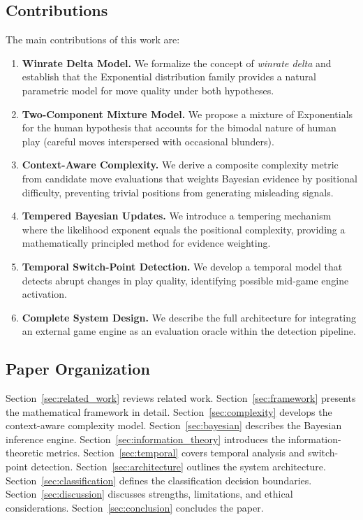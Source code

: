 \documentclass[11pt,a4paper]{article}
\begin{document}
\subsection{Contributions}

The main contributions of this work are:

\begin{enumerate}
    \item \textbf{Winrate Delta Model.} We formalize the concept of
          \emph{winrate delta} and establish that the Exponential distribution
          family provides a natural parametric model for move quality under both
          hypotheses.
    \item \textbf{Two-Component Mixture Model.} We propose a mixture of
          Exponentials for the human hypothesis that accounts for the bimodal
          nature of human play (careful moves interspersed with occasional
          blunders).
    \item \textbf{Context-Aware Complexity.} We derive a composite complexity
          metric from candidate move evaluations that weights Bayesian evidence
          by positional difficulty, preventing trivial positions from generating
          misleading signals.
    \item \textbf{Tempered Bayesian Updates.} We introduce a tempering mechanism
          where the likelihood exponent equals the positional complexity,
          providing a mathematically principled method for evidence weighting.
    \item \textbf{Temporal Switch-Point Detection.} We develop a temporal model
          that detects abrupt changes in play quality, identifying possible
          mid-game engine activation.
    \item \textbf{Complete System Design.} We describe the full architecture for
          integrating an external game engine as an evaluation oracle within the
          detection pipeline.
\end{enumerate}

\subsection{Paper Organization}

Section~\ref{sec:related_work} reviews related work. Section~\ref{sec:framework}
presents the mathematical framework in detail. Section~\ref{sec:complexity}
develops the context-aware complexity model. Section~\ref{sec:bayesian}
describes the Bayesian inference engine. Section~\ref{sec:information_theory}
introduces the information-theoretic metrics. Section~\ref{sec:temporal}
covers temporal analysis and switch-point detection.
Section~\ref{sec:architecture} outlines the system architecture.
Section~\ref{sec:classification} defines the classification decision
boundaries. Section~\ref{sec:discussion} discusses strengths, limitations, and
ethical considerations. Section~\ref{sec:conclusion} concludes the paper.
\end{document}
